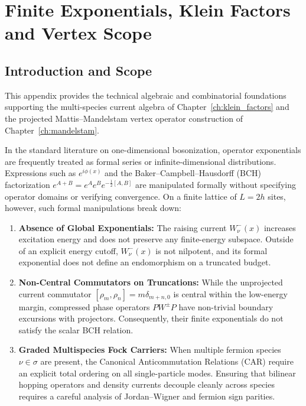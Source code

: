 \chapter{Finite Exponentials, Klein Factors and Vertex Scope}
\label{app:exponentials_klein}

\section{Introduction and Scope}

This appendix provides the technical algebraic and combinatorial foundations supporting the multi-species current algebra of Chapter~\ref{ch:klein_factors} and the projected Mattis--Mandelstam vertex operator construction of Chapter~\ref{ch:mandelstam}.

In the standard literature on one-dimensional bosonization, operator exponentials are frequently treated as formal series or infinite-dimensional distributions. Expressions such as $e^{i \phi(x)}$ and the Baker--Campbell--Hausdorff (BCH) factorization $e^{A+B} = e^A e^B e^{-\frac{1}{2}[A,B]}$ are manipulated formally without specifying operator domains or verifying convergence.
On a finite lattice of $L = 2h$ sites, however, such formal manipulations break down:
\begin{enumerate}
    \item \textbf{Absence of Global Exponentials:} The raising current $W^-_\nu(x)$ increases excitation energy and does not preserve any finite-energy subspace. Outside of an explicit energy cutoff, $W^-_\nu(x)$ is not nilpotent, and its formal exponential does not define an endomorphism on a truncated budget.
    \item \textbf{Non-Central Commutators on Truncations:} While the unprojected current commutator $[\rho_m, \rho_n] = m \delta_{m+n, 0}$ is central within the low-energy margin, compressed phase operators $P W^\pm P$ have non-trivial boundary excursions with projectors. Consequently, their finite exponentials do not satisfy the scalar BCH relation.
    \item \textbf{Graded Multispecies Fock Carriers:} When multiple fermion species $\nu \in \sigma$ are present, the Canonical Anticommutation Relations (CAR) require an explicit total ordering on all single-particle modes. Ensuring that bilinear hopping operators and density currents decouple cleanly across species requires a careful analysis of Jordan--Wigner and fermion sign parities.
\end{enumerate}

